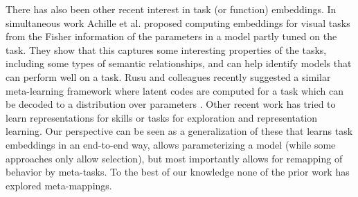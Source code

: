 \documentclass{article}
\begin{document}
There has also been other recent interest in task (or function) embeddings. In simultaneous work Achille et al. \citep{Achille2019} proposed computing embeddings for visual tasks from the Fisher information of the parameters in a model partly tuned on the task. They show that this captures some interesting properties of the tasks, including some types of semantic relationships, and can help identify models that can perform well on a task. Rusu and colleagues recently suggested a similar meta-learning framework where latent codes are computed for a task which can be decoded to a distribution over parameters \citep{Rusu2019}. Other recent work has tried to learn representations for skills \citep[e.g.][]{Eysenbach2019} or tasks \citep[e.g.]{Hsu2019} for exploration and representation learning. Our perspective can be seen as a generalization of these that learns task embeddings in an end-to-end way, allows parameterizing a model (while some approaches only allow selection), but most importantly allows for remapping of behavior by meta-tasks. To the best of our knowledge none of the prior work has explored meta-mappings. \par
 \vspace{-1em}
\end{document}
